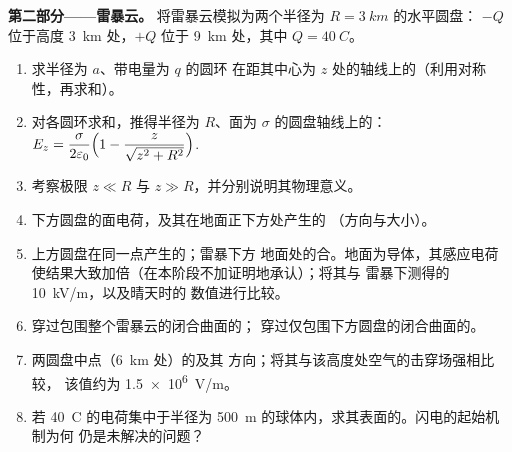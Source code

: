 \begin{problem}
\medskip
\noindent\textbf{第二部分——雷暴云。}
将雷暴云模拟为两个半径为 $R = \qty{3}{km}$ 的水平圆盘：
$-Q$ 位于高度 \qty{3}{km} 处，$+Q$ 位于 \qty{9}{km} 处，其中 $Q = \qty{40}{C}$。
\begin{enumerate}[resume]
  \item 求半径为 $a$、带电量为 $q$ 的圆环
        在距其中心为 $z$ 处的轴线上的（利用对称性，再求和）。
  \item 对各圆环求和，推得半径为 $R$、面为 $\sigma$
        的圆盘轴线上的：
        $E_z = \dfrac{\sigma}{2\varepsilon_0}\Bigl(1 - \dfrac{z}{\sqrt{z^2 + R^2}}\Bigr)$.
  \item 考察极限 $z \ll R$ 与 $z \gg R$，并分别说明其物理意义。
  \item 下方圆盘的面电荷，及其在地面正下方处产生的
        （方向与大小）。
  \item 上方圆盘在同一点产生的；雷暴下方
        地面处的合。地面为导体，其感应电荷
        使结果大致加倍（在本阶段不加证明地承认）；将其与
        雷暴下测得的 \qty{10}{kV/m}，以及晴天时的
        数值进行比较。
  \item 穿过包围整个雷暴云的闭合曲面的；
        穿过仅包围下方圆盘的闭合曲面的。
  \item 两圆盘中点（\qty{6}{km} 处）的及其
        方向；将其与该高度处空气的击穿场强相比较，
        该值约为 \qty{1.5e6}{V/m}。
  \item 若 \qty{40}{C} 的电荷集中于半径为
        \qty{500}{m} 的球体内，求其表面的。闪电的起始机制为何
        仍是未解决的问题？
\end{enumerate}


\end{problem}
